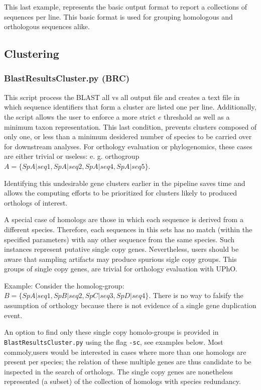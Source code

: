 \documentclass[10pt]{article}
\begin{document}
This last example, represents the basic output format to report a collections of 
sequences per line. This basic format is used for grouping homologous and orthologous sequences  alike. 

\subsection{Clustering}

\subsubsection{BlastResultsCluster.py (BRC)} This script process
the BLAST all vs all output file and creates a text file in which
sequence identifiers that form a cluster are listed one per
line. Additionally, the script allows the user to enforce a more
strict $e$ threshold as well as a minimum taxon representation. This
last condition, prevents clusters composed of only one, or less than a
minimum desidered number of species to be carried over for downstream
analyses. For orthology evaluation or phylogenomics, these cases are
either trivial or useless: e. g. orthogroup $A=\{SpA|seq1,
SpA|seq2,SpA|seq4, SpA|seq5\}$.

Identifying this undesirable gene clusters earlier in the pipeline
saves time and allows the computing efforts to be prioritized for
clusters likely to produced orthologs of interest.

A special case of homologs are those in which each sequence is derived
from a different species. Therefore, each sequences in this sets has no
match (within the specified parameters) with any other sequence from
the same species. Such instances represent putative single copy
genes. Nevertheless, users should be aware that sampling artifacts may
produce spurious sigle copy groups. This groups of single copy genes,
are trivial for orthology evaluation with UPhO.

Example: Consider the homolog-group: $B=\{SpA|seq1, SpB|seq2,
SpC|seq3,SpD|seq4\}$.  There is no way to falsify the assumption of
orthology because there is not evidence of a single gene duplication
event.

An option to find only these single copy homolo-groups is provided in
\texttt{BlastResultsCluster.py} using the flag \texttt{-sc}, see examples below. 
Most commoly,users would be interested in cases where more than one  homologs are present per species; the relation of these multiple genes 
are thus candidate to be inspected in the search of orthologs. The single
copy genes are nonetheless represented (a subset) of the collection
of homologs with species redundancy.
\end{document}
